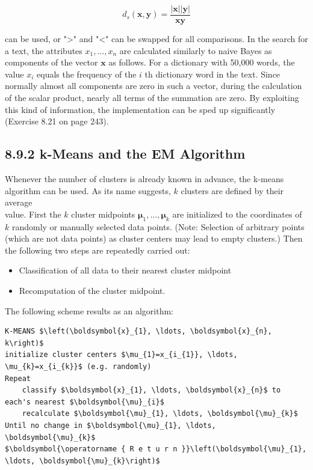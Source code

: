 \documentclass[10pt]{book}
\begin{document}
\begin{center}
\begin{enumerate}
\begin{center}
\begin{center}
\begin{center}
$$
d_{s}(\boldsymbol{x}, \boldsymbol{y})=\frac{|\boldsymbol{x}||\boldsymbol{y}|}{\boldsymbol{x} \boldsymbol{y}}
$$

can be used, or ">" and "<" can be swapped for all comparisons. In the search for a text, the attributes $x_{1}, \ldots, x_{n}$ are calculated similarly to naive Bayes as components of the vector $\boldsymbol{x}$ as follows. For a dictionary with 50,000 words, the value $x_{i}$ equals the frequency of the $i$ th dictionary word in the text. Since normally almost all components are zero in such a vector, during the calculation of the scalar product, nearly all terms of the summation are zero. By exploiting this kind of information, the implementation can be sped up significantly (Exercise 8.21 on page 243).

\subsection*{8.9.2 k-Means and the EM Algorithm}
Whenever the number of clusters is already known in advance, the k-means algorithm can be used. As its name suggests, $k$ clusters are defined by their average\\
value. First the $k$ cluster midpoints $\boldsymbol{\mu}_{1}, \ldots, \boldsymbol{\mu}_{k}$ are initialized to the coordinates of $k$ randomly or manually selected data points. (Note: Selection of arbitrary points (which are not data points) as cluster centers may lead to empty clusters.) Then the following two steps are repeatedly carried out:


\begin{itemize}
  \item Classification of all data to their nearest cluster midpoint
  \item Recomputation of the cluster midpoint.
\end{itemize}

The following scheme results as an algorithm:

\begin{verbatim}
K-MEANS $\left(\boldsymbol{x}_{1}, \ldots, \boldsymbol{x}_{n}, k\right)$
initialize cluster centers $\mu_{1}=x_{i_{1}}, \ldots, \mu_{k}=x_{i_{k}}$ (e.g. randomly)
Repeat
    classify $\boldsymbol{x}_{1}, \ldots, \boldsymbol{x}_{n}$ to each's nearest $\boldsymbol{\mu}_{i}$
    recalculate $\boldsymbol{\mu}_{1}, \ldots, \boldsymbol{\mu}_{k}$
Until no change in $\boldsymbol{\mu}_{1}, \ldots, \boldsymbol{\mu}_{k}$
$\boldsymbol{\operatorname { R e t u r n }}\left(\boldsymbol{\mu}_{1}, \ldots, \boldsymbol{\mu}_{k}\right)$
\end{verbatim}


\end{center}
\end{center}
\end{center}
\end{enumerate}
\end{center}
\end{document}
